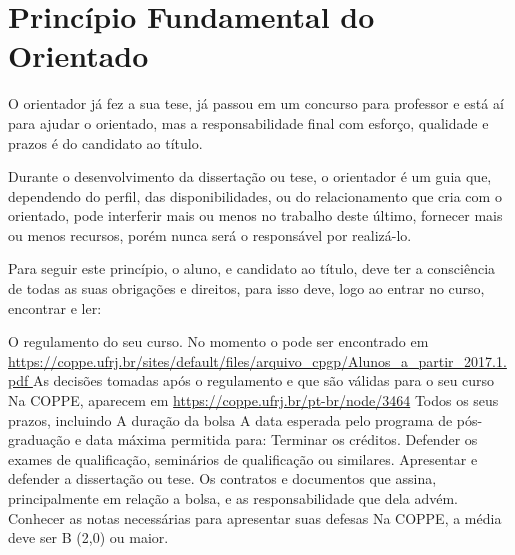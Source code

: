\chapter{Princípio Fundamental do Orientado}
\label{chap:pfo}



O orientador já fez a sua tese, já passou em um concurso para professor e está aí para ajudar o orientado, mas a responsabilidade final com esforço, qualidade e prazos é do candidato ao título.

Durante o desenvolvimento da dissertação ou tese, o orientador é um guia que, dependendo do perfil, das disponibilidades, ou do relacionamento que cria com o orientado, pode interferir mais ou menos no trabalho deste último, fornecer mais ou menos recursos, porém nunca será o responsável por realizá-lo.

Para seguir este princípio, o aluno, e candidato ao título, deve ter a consciência de todas as suas obrigações e direitos, para isso deve, logo ao entrar no curso, encontrar e ler:

\begin{outline}
\1	O regulamento do seu curso.
\2	No momento o  pode ser encontrado em \url{https://coppe.ufrj.br/sites/default/files/arquivo_cpgp/Alunos_a_partir_2017.1.pdf }
\1	As decisões tomadas após o regulamento e que são válidas para o seu curso
\2	Na COPPE, aparecem em \url{https://coppe.ufrj.br/pt-br/node/3464}
\1	Todos os seus prazos, incluindo
\2	A duração da bolsa
\2	A data esperada pelo programa de pós-graduação e data máxima permitida para:
\3	Terminar os créditos.
\3	Defender os exames de qualificação, seminários de qualificação ou similares.
\3	Apresentar e defender a dissertação ou tese.
\1	Os contratos e documentos que assina, principalmente em relação a bolsa, e as responsabilidade que dela advém.
\1	Conhecer as notas necessárias para apresentar suas defesas
\2	Na COPPE, a média deve ser B (2,0) ou maior.
\end{outline}
